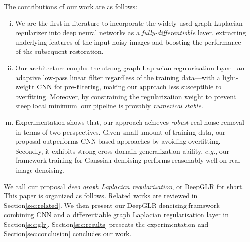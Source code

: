 \documentclass[10pt,twocolumn,letterpaper]{article}
\begin{document}
The contributions of our work are as follows:
%
\begin{enumerate}[(i)]
\item We are the first in literature to incorporate the widely used graph Laplacian regularizer into deep neural networks as a \textit{fully-differentiable} layer, extracting underlying features of the input noisy images and boosting the performance of the subsequent restoration.
%
\item Our architecture couples the strong graph Laplacian regularization layer---an adaptive low-pass linear filter regardless of the training data---with a light-weight CNN for pre-filtering, making our approach less susceptible to overfitting. 
Moreover, by constraining the regularization weight to prevent steep local minimum, our pipeline is provably {\it numerical stable}.
%
\item Experimentation shows that, our approach achieves \emph{robust} real noise removal in terms of two perspectives. 
Given small amount of training data, our proposal outperforms CNN-based approaches by avoiding overfitting. 
Secondly, it exhibits strong cross-domain generalization ability, {\it e.g.},  our framework training for Gaussian denoising performs reasonably well on real image denoising.
%
\end{enumerate}

We call our proposal \emph{deep graph Laplacian regularization}, or DeepGLR for short.
This paper is organized as follows. 
Related works are reviewed in Section\;\ref{sec:related}. 
We then present our DeepGLR denoising framework combining CNN and a differentiable graph Laplacian regularization layer in Section\;\ref{sec:glr}. 
Section\;\ref{sec:results} presents the experimentation and Section\;\ref{sec:conclusion} concludes our work.
\end{document}
